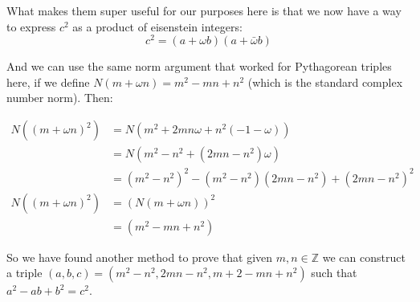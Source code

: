 \documentclass{article}
\begin{document}
What makes them super useful for our purposes here is that we now have a way to express $c^2$ as a
product of eisenstein integers:
\[ c^2 = (a+\omega b) (a + \bar{\omega} b) \]

And we can use the same norm argument that worked for Pythagorean triples here, if we define
$N(m+\omega n) = m^2-mn+n^2$ (which is the standard complex number norm). Then:

\begin{align*}
	N((m+\omega n)^2) &= N(m^2+2mn\omega + n^2(-1-\omega)) \\
	&= N(m^2-n^2+(2mn-n^2)\omega) \\
	&= (m^2-n^2)^2 - (m^2-n^2)(2mn-n^2) + (2mn-n^2)^2 \\
	N((m+\omega n)^2) &= (N(m+\omega n))^2 \\
	&= (m^2 - mn + n^2)
\end{align*}

So we have found another method to prove that given $m,n \in \mathbb{Z}$ we can construct a triple
$(a,b,c) = (m^2-n^2, 2mn-n^2, m+2-mn+n^2)$ such that $a^2-ab+b^2 = c^2$.
\end{document}
